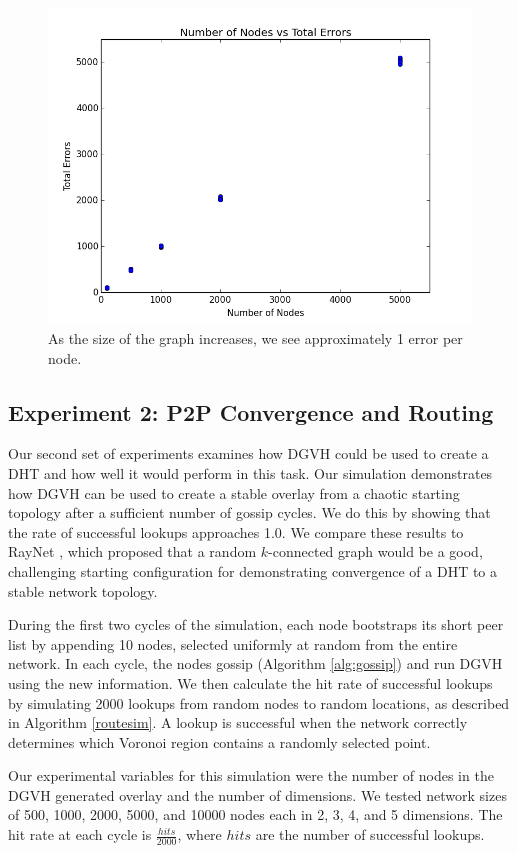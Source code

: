 \begin{figure}
	\centering
	\includegraphics[width=0.75\linewidth]{error_rate}
	\caption{As the size of the graph increases, we see approximately 1 error per node.}
	\label{exp_0}
\end{figure}







\subsection{Experiment 2: P2P Convergence and Routing}
Our second set of experiments examines how DGVH could be used to create a DHT and how well it would perform in this task.
Our simulation demonstrates how DGVH  can be used to create a stable overlay from a chaotic starting topology after a sufficient number of gossip cycles.  
We do this by showing that the rate of successful lookups approaches 1.0.
We compare these results to RayNet \cite{raynet}, which proposed that a random $k$-connected graph would be a good, challenging starting configuration for demonstrating convergence of a DHT to a stable network topology.

During the first two cycles of the simulation, each node bootstraps its short peer list by appending 10 nodes, selected uniformly at random from the entire network.
In each cycle, the nodes gossip (Algorithm \ref{alg:gossip}) and run DGVH using the new information.
We then calculate the hit rate of successful lookups by simulating 2000 lookups from random nodes to random locations, as described in Algorithm \ref{routesim}.
A lookup is successful when the network correctly determines which Voronoi region contains a randomly selected point.


Our experimental variables for this simulation were the number of nodes in the DGVH generated overlay and the number of dimensions.  
We tested network sizes of 500, 1000, 2000, 5000, and 10000 nodes each in 2, 3, 4, and 5 dimensions.
The hit rate at each cycle is $\frac{hits}{2000}$, where $hits$ are the number of successful lookups.





